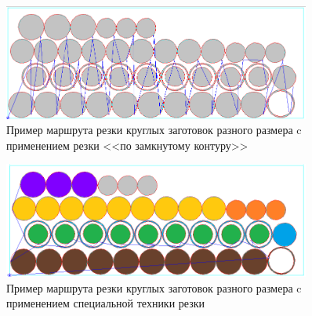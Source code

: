 \documentclass[11pt,twoside]{report}
\begin{document}
\begin{figure}
  \begin{center}
  \includegraphics[width=0.9\textwidth]{circles-c.png}
  \caption{Пример маршрута резки круглых заготовок разного размера c применением резки <<по замкнутому контуру>>}
  \label{circles-c}
  \end{center}
\end{figure}

\begin{figure}
  \begin{center}
  \includegraphics[width=0.9\textwidth]{circles-d.png}
  \caption{Пример маршрута резки круглых заготовок разного размера c применением специальной техники резки}
  \label{circles-d}
  \end{center}
\end{figure}
\end{document}

